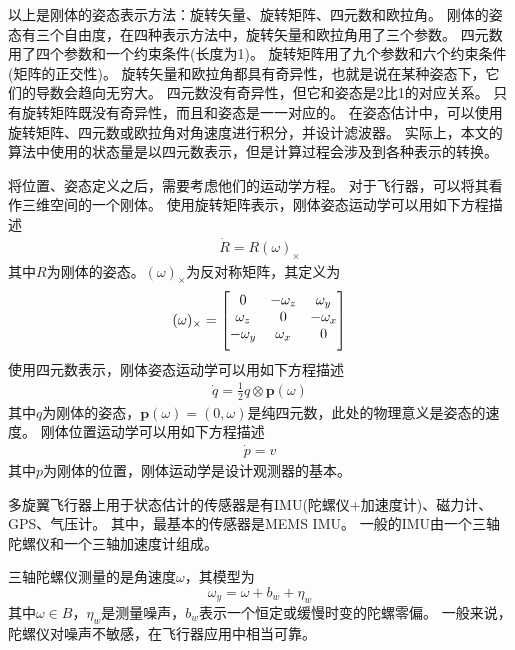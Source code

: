 \documentclass[
  type=master
]{gdutthesis}
\begin{document}
以上是刚体的姿态表示方法：旋转矢量、旋转矩阵、四元数和欧拉角。
刚体的姿态有三个自由度，在四种表示方法中，旋转矢量和欧拉角用了三个参数。
四元数用了四个参数和一个约束条件(长度为1)。
旋转矩阵用了九个参数和六个约束条件(矩阵的正交性)。
旋转矢量和欧拉角都具有奇异性，也就是说在某种姿态下，它们的导数会趋向无穷大。
四元数没有奇异性，但它和姿态是2比1的对应关系。
只有旋转矩阵既没有奇异性，而且和姿态是一一对应的。
在姿态估计中，可以使用旋转矩阵、四元数或欧拉角对角速度进行积分，并设计滤波器。
实际上，本文的算法中使用的状态量是以四元数表示，但是计算过程会涉及到各种表示的转换。

将位置、姿态定义之后，需要考虑他们的运动学方程。
对于飞行器，可以将其看作三维空间的一个刚体。
使用旋转矩阵表示，刚体姿态运动学可以用如下方程描述
\begin{gather}\label{eq:matrixkinematics}
	\dot{R}=R (\omega)_{\times}
\end{gather}
\vspace{1ex}其中$R$为刚体的姿态。$(\omega)_{\times}$为反对称矩阵，其定义为
\begin{gather}\label{eq:matrixkinematics}
	(\omega)_{\times}=
	\begin{bmatrix}
		0 & -\omega_z & \omega_y\\
		\omega_z & 0 & -\omega_x\\
		-\omega_y & \omega_x & 0\vspace{1ex}
	\end{bmatrix}
\end{gather}
\vspace{1ex}使用四元数表示，刚体姿态运动学可以用如下方程描述
\begin{gather}\label{eq:quatkinematics}
	\dot{q}=\frac{1}{2} q \otimes \mathbf{p}(\omega)
\end{gather}
其中$q$为刚体的姿态，$\mathbf{p}(\omega)=(0,\omega)$是纯四元数，此处的物理意义是姿态的速度。
刚体位置运动学可以用如下方程描述
\begin{gather}\label{eq:matrixkinematics}
	\dot{p}=v
\end{gather}
其中$p$为刚体的位置，刚体运动学是设计观测器的基本。

多旋翼飞行器上用于状态估计的传感器是有IMU(陀螺仪+加速度计)、磁力计、GPS、气压计。
其中，最基本的传感器是MEMS IMU。
一般的IMU由一个三轴陀螺仪和一个三轴加速度计组成。

三轴陀螺仪测量的是角速度$\omega$，其模型为
\begin{equation}\label{eq:gyromodel}
	\omega_y=\omega+b_w+\eta_w
\end{equation}
其中$\omega \in B$，$\eta_w$是测量噪声，$b_w$表示一个恒定或缓慢时变的陀螺零偏。
一般来说，陀螺仪对噪声不敏感，在飞行器应用中相当可靠。
\end{document}
